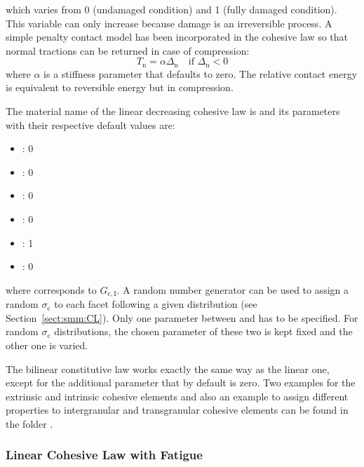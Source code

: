 which varies from 0 (undamaged condition) and 1 (fully
damaged condition). This variable can only increase because damage is
an irreversible process. A simple penalty contact model has been incorporated
in the cohesive law so that normal tractions can be returned in
case of compression:
\begin{equation}
  T_\mathrm{n} = \alpha \Delta_\mathrm{n} \quad\text{if
    $\Delta_\mathrm{n} < 0$}
\end{equation}
where $\alpha$ is a stiffness parameter that defaults to zero. The
relative contact energy is equivalent to reversible energy but in
compression.

The material name of the linear decreasing cohesive law  is
 and its parameters with their
respective default values are:
\begin{itemize}
\item {}: 0
\item {}: 0
\item {}: 0
\item {}: 0
\item {}: 1
\item {}: 0
\end{itemize}
where  corresponds to $G_\mathrm{c, I}$. A random number
generator can be used to assign a random $\sigma_\mathrm{c}$ to each
facet following a given distribution (see
Section~\ref{sect:smm:CL}). Only one parameter between 
and  has to be specified. For random $\sigma_\mathrm{c}$
distributions, the chosen parameter of these two is kept fixed and the
other one is varied.

The bilinear constitutive law works exactly the same way as the linear
one, except for the additional parameter  that by
default is zero. Two examples for the extrinsic and intrinsic cohesive
elements and also an example to assign different properties to
intergranular and transgranular cohesive elements can be found in
the folder .

\subsubsection{Linear Cohesive Law with Fatigue}

